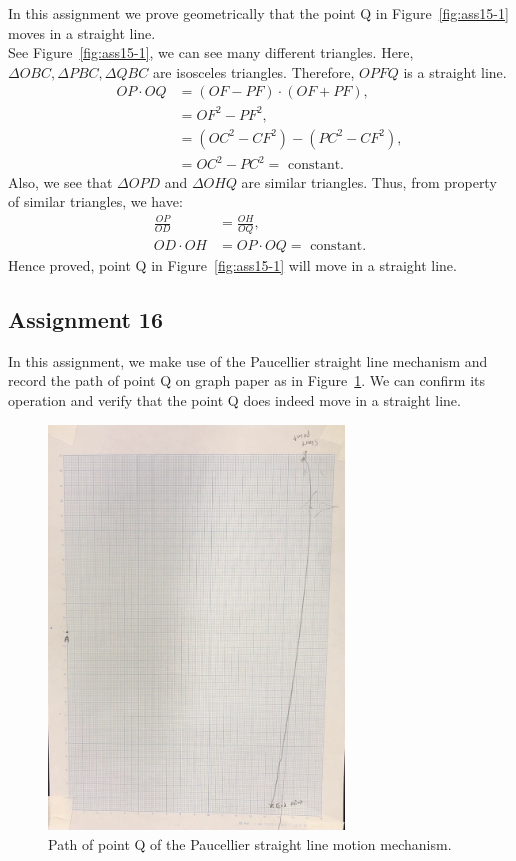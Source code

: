 \documentclass[12pt,a4paper]{report}
\begin{document}
In this assignment we prove geometrically that the point Q in Figure~\ref{fig:ass15-1} moves in a straight line. \\
See Figure~\ref{fig:ass15-1}, we can see many different triangles. 
Here, \(\Delta OBC, \Delta PBC, \Delta QBC\) are isosceles triangles. Therefore, \(OPFQ\) is a straight line. 
\begin{align}
    OP\cdot OQ &= (OF-PF)\cdot (OF+PF),\\
               &=OF^2-PF^2,\\
               &=(OC^2-CF^2)-(PC^2-CF^2),\\
               &=OC^2-PC^2=\text{ constant.}
\end{align}
Also, we see that \(\Delta OPD\) and \(\Delta OHQ\) are similar triangles. 
Thus, from property of similar triangles, we have: 
\begin{align}
    \frac{OP}{OD}&=\frac{OH}{OQ},\\
    OD\cdot OH&=OP\cdot OQ=\text{ constant.}
\end{align}
Hence proved, point Q in Figure~\ref{fig:ass15-1} will move in a straight line.  
\subsection{\textbf{Assignment 16}}
In this assignment, we make use of the Paucellier straight line mechanism and record the path of point Q on graph paper 
as in Figure~\ref{fig:ass16}. We can confirm its operation and verify that the point Q does indeed move in a straight line. 
\begin{figure}[htbp]
        \centering
    \includegraphics[width=0.7\textwidth]{figures/ass16.jpg}
    \caption{Path of point Q of the Paucellier straight line motion mechanism.}
    \label{fig:ass16}
\end{figure}
\end{document}
